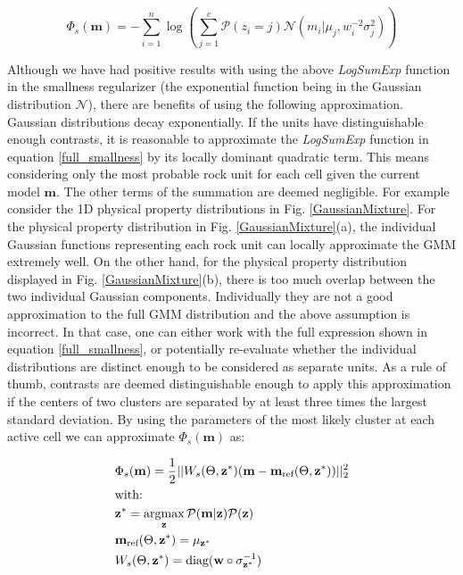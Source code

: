 \documentclass[extra]{gji} %
\begin{document}
\begin{equation}
\Phi_s(\mathbf{m}) = - \sum_{i=1}^{n} \log\left(\sum_{j=1}^c \mathcal{P}(z_i=j) \mathcal{N}({m}_i|{\mu}_j, {w}_{i}^{-2}\sigma_j^2)\right) \label{full_smallness}
\end{equation}

Although we have had positive results with using the above \textit{LogSumExp} function in the smallness regularizer (the exponential function being in the Gaussian distribution $\mathcal{N}$), there are benefits of using the following approximation. Gaussian distributions decay exponentially. If the units have distinguishable enough contrasts, it is reasonable to approximate the \textit{LogSumExp} function in equation \ref{full_smallness} by its locally dominant quadratic term. This means considering only the most probable rock unit for each cell given the current model $\mathbf{m}$. The other terms of the summation are deemed negligible. For example consider the 1D physical property distributions in Fig. \ref{GaussianMixture}. For the physical property distribution in Fig. \ref{GaussianMixture}(a), the individual Gaussian functions representing each rock unit can locally approximate the GMM extremely well. On the other hand, for the physical property distribution displayed in Fig. \ref{GaussianMixture}(b), there is too much overlap between the two individual Gaussian components. Individually they are not a good approximation to the full GMM distribution and the above assumption is incorrect. In that case, one can either work with the full expression shown in equation \ref{full_smallness}, or potentially re-evaluate whether the individual distributions are distinct enough to be considered as separate units. As a rule of thumb, contrasts are deemed distinguishable enough to apply this approximation if the centers of two clusters are separated by at least three times the largest standard deviation. By using the parameters of the most likely cluster at each active cell we can approximate $\Phi_{s}(\mathbf{m})$ as:

\begin{align}
&\Phi_{s}(\mathbf{m}) = \frac{1}{2}||W_{s}(\Theta, \mathbf{z}^*)(\mathbf{m}-\mathbf{m}_{\text{ref}}(\Theta, \mathbf{z}^*))||_2^2 \label{smallness_petro}\\
&\text{with:}\nonumber\\
&\mathbf{z^*} = \mathop{\hbox{argmax}}\limits_{\mathbf{z}}\mathcal{P}(\mathbf{m}|\mathbf{z})\mathcal{P}(\mathbf{z}) \label{membership} \\
&\mathbf{m}_{\text{ref}}(\Theta, \mathbf{z}^*) = {\mu}_{\mathbf{z}^*} \label{mref_update}\\
&W_{s}(\Theta, \mathbf{z}^*) = \text{diag}({\mathbf{w}}\circ{\sigma_{\mathbf{z}^*}^{-1}}) \label{Ws_update}
\end{align}
\end{document}
